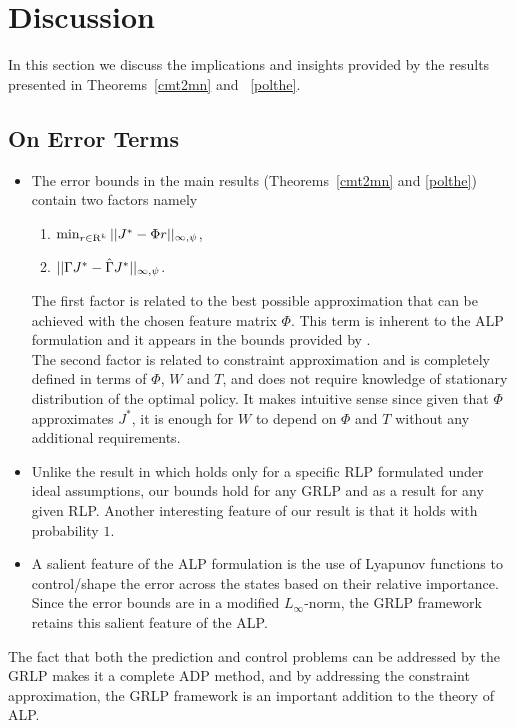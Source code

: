 \section{Discussion}
In this section we discuss the implications and insights provided by the results presented in Theorems~\ref{cmt2mn} and ~\ref{polthe}.
\subsection{On Error Terms}
\begin{itemize}
\item The error bounds in the main results (Theorems~\ref{cmt2mn} and \ref{polthe}) contain two factors namely
\begin{enumerate}
\item $\min_{r\in \mathrm{R}^k} ||J^*-\Phi r||_{\infty,\psi}$,
\item $||\Gamma J^*-\hat{\Gamma} J^*||_{\infty,\psi}$.
\end{enumerate}
The first factor is related to the best possible approximation that can be achieved with the chosen feature matrix $\Phi$. This term is inherent to the ALP formulation and it appears in the bounds provided by \cite{ALP}.\\
The second factor is related to constraint approximation and is completely defined in terms of $\Phi$, $W$ and $T$, and does not require knowledge of stationary distribution of the optimal policy. It makes intuitive sense since given that $\Phi$ approximates $J^*$, it is enough for $W$ to depend on $\Phi$ and $T$ without any additional requirements.
\item Unlike the result in \cite{CS} which holds only for a specific RLP formulated under ideal assumptions, our bounds hold for any GRLP and as a result for any given RLP. Another interesting feature of our result is that it holds with probability $1$. 
\item A salient feature of the ALP formulation is the use of Lyapunov functions to control/shape the error across the states based on their relative importance. Since the error bounds are in a modified $L_\infty$-norm, the GRLP framework retains this salient feature of the ALP.
\end{itemize}
The fact that both the prediction and control problems can be addressed by the GRLP makes it a complete ADP method, and by addressing the constraint approximation, the GRLP framework is an important addition to the theory of ALP.
